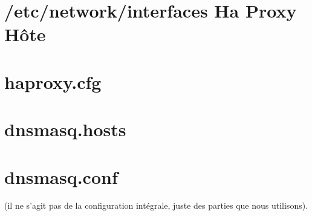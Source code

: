 \documentclass[a4paper,10pt,one side,titlepage]{report}
\begin{document}
\section{/etc/network/interfaces Ha Proxy Hôte}
\label{lst:interfaces}


\section{haproxy.cfg}
\label{lst:haproxycfg}


\section{dnsmasq.hosts}
\label{lst:dnshosts}


\section{dnsmasq.conf}
\label{lst:dnsconf}

(il ne s'agit pas de la configuration intégrale, juste des parties que nous utilisons).

\printglossaries
\end{document}
